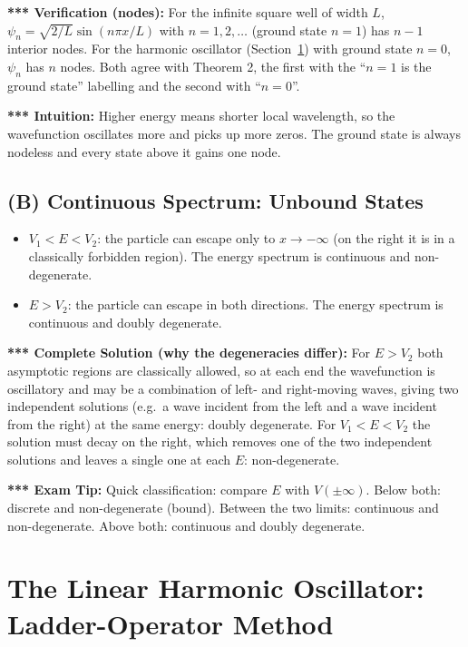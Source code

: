 \documentclass[11pt,a4paper]{article}
\begin{document}
\textbf{*** Verification (nodes):} For the infinite square well of width $L$, $\psi_n=\sqrt{2/L}\sin(n\pi x/L)$ with $n=1,2,\dots$ (ground state $n=1$) has $n-1$ interior nodes. For the harmonic oscillator (Section~\ref{fd:sec:sho}) with ground state $n=0$, $\psi_n$ has $n$ nodes. Both agree with Theorem 2, the first with the ``$n=1$ is the ground state'' labelling and the second with ``$n=0$''.

\textbf{*** Intuition:} Higher energy means shorter local wavelength, so the wavefunction oscillates more and picks up more zeros. The ground state is always nodeless and every state above it gains one node.

\subsection{(B) Continuous Spectrum: Unbound States}
\begin{itemize}[itemsep=2pt]
\item[(i)] $V_1<E<V_2$: the particle can escape only to $x\to-\infty$ (on the right it is in a classically forbidden region). The energy spectrum is continuous and non-degenerate.
\item[(ii)] $E>V_2$: the particle can escape in both directions. The energy spectrum is continuous and doubly degenerate.
\end{itemize}
\textbf{*** Complete Solution (why the degeneracies differ):} For $E>V_2$ both asymptotic regions are classically allowed, so at each end the wavefunction is oscillatory and may be a combination of left- and right-moving waves, giving two independent solutions (e.g.\ a wave incident from the left and a wave incident from the right) at the same energy: doubly degenerate. For $V_1<E<V_2$ the solution must decay on the right, which removes one of the two independent solutions and leaves a single one at each $E$: non-degenerate.

\textbf{*** Exam Tip:} Quick classification: compare $E$ with $V(\pm\infty)$. Below both: discrete and non-degenerate (bound). Between the two limits: continuous and non-degenerate. Above both: continuous and doubly degenerate.
\section{The Linear Harmonic Oscillator: Ladder-Operator Method}
\label{fd:sec:sho}
\end{document}
